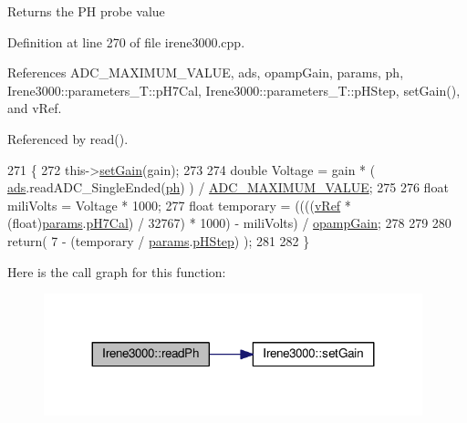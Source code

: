 \begin{DoxyReturn}{Returns}
the PH probe value 
\end{DoxyReturn}


Definition at line 270 of file irene3000.\+cpp.



References A\+D\+C\+\_\+\+M\+A\+X\+I\+M\+U\+M\+\_\+\+V\+A\+L\+UE, ads, opamp\+Gain, params, ph, Irene3000\+::parameters\+\_\+\+T\+::p\+H7\+Cal, Irene3000\+::parameters\+\_\+\+T\+::p\+H\+Step, set\+Gain(), and v\+Ref.



Referenced by read().


\begin{DoxyCode}
271 \{
272   this->\hyperlink{classIrene3000_aff7c5da186b388e7272e63ff88a20c34}{setGain}(gain);
273 
274   \textcolor{keywordtype}{double} Voltage =  gain * ( \hyperlink{classIrene3000_a1215e77ba761c9908d80d691f149e135}{ads}.readADC\_SingleEnded(\hyperlink{Irene3000_8h_af771ceafe0e6524dd8497d4305dfe778}{ph}) ) / 
      \hyperlink{Irene3000_8h_ae04444a85a37b5dce09107f2ce2b2c80}{ADC\_MAXIMUM\_VALUE};
275 
276   \textcolor{keywordtype}{float} miliVolts = Voltage * 1000;
277   \textcolor{keywordtype}{float} temporary = ((((\hyperlink{classIrene3000_a018e7ff9bee57e6d2b298667a668ba7e}{vRef} * (float)\hyperlink{classIrene3000_a136585a5ee7f9ac6ab52175fa153f8e3}{params}.\hyperlink{structIrene3000_1_1parameters__T_a21265466a570d84bff914f26d2f7a03e}{pH7Cal}) / 32767) * 1000) - miliVolts) / 
      \hyperlink{classIrene3000_a4e588985ca74e5076029d5dee81034f2}{opampGain};
278 
279 
280  \textcolor{keywordflow}{return}( 7 - (temporary / \hyperlink{classIrene3000_a136585a5ee7f9ac6ab52175fa153f8e3}{params}.\hyperlink{structIrene3000_1_1parameters__T_a61cfcc2539d5f630e9071f3753aba9fe}{pHStep}) );
281 
282 \}
\end{DoxyCode}
Here is the call graph for this function\+:
\nopagebreak
\begin{figure}[H]
\begin{center}
\leavevmode
\includegraphics[width=311pt]{classIrene3000_abf3db725fabb0634ec889b32068a5eec_cgraph}
\end{center}
\end{figure}
